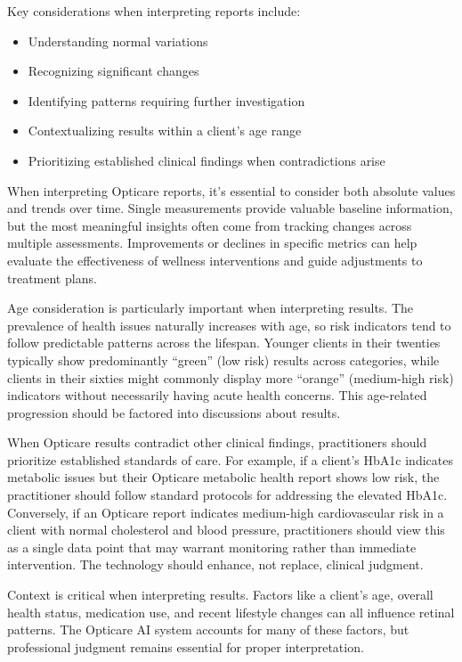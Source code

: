 \documentclass[
  Letterpaper,
]{scrbook}
\providecommand{\tightlist}{%
  \setlength{\itemsep}{0pt}\setlength{\parskip}{0pt}}\usepackage{longtable,booktabs,array}
\begin{document}
Key considerations when interpreting reports include:

\begin{itemize}
\tightlist
\item
  Understanding normal variations
\item
  Recognizing significant changes
\item
  Identifying patterns requiring further investigation
\item
  Contextualizing results within a client's age range
\item
  Prioritizing established clinical findings when contradictions arise
\end{itemize}

When interpreting Opticare reports, it's essential to consider both
absolute values and trends over time. Single measurements provide
valuable baseline information, but the most meaningful insights often
come from tracking changes across multiple assessments. Improvements or
declines in specific metrics can help evaluate the effectiveness of
wellness interventions and guide adjustments to treatment plans.

Age consideration is particularly important when interpreting results.
The prevalence of health issues naturally increases with age, so risk
indicators tend to follow predictable patterns across the lifespan.
Younger clients in their twenties typically show predominantly ``green''
(low risk) results across categories, while clients in their sixties
might commonly display more ``orange'' (medium-high risk) indicators
without necessarily having acute health concerns. This age-related
progression should be factored into discussions about results.

When Opticare results contradict other clinical findings, practitioners
should prioritize established standards of care. For example, if a
client's HbA1c indicates metabolic issues but their Opticare metabolic
health report shows low risk, the practitioner should follow standard
protocols for addressing the elevated HbA1c. Conversely, if an Opticare
report indicates medium-high cardiovascular risk in a client with normal
cholesterol and blood pressure, practitioners should view this as a
single data point that may warrant monitoring rather than immediate
intervention. The technology should enhance, not replace, clinical
judgment.

Context is critical when interpreting results. Factors like a client's
age, overall health status, medication use, and recent lifestyle changes
can all influence retinal patterns. The Opticare AI system accounts for
many of these factors, but professional judgment remains essential for
proper interpretation.
\end{document}
